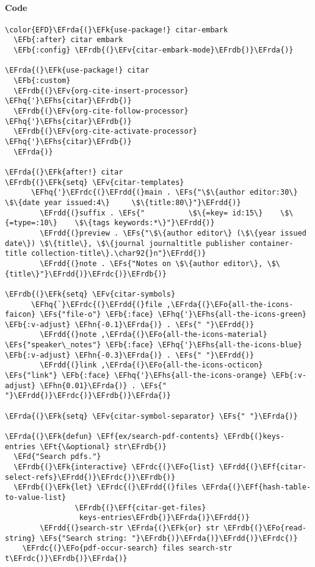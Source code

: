 \documentclass[a4wide,10pt]{article}
\newcommand{\EFs}[1]{\textcolor{EFs}{#1}} %
\newcommand{\EFd}[1]{\textcolor{EFd}{#1}} %
\newcommand{\EFk}[1]{\textcolor{EFk}{#1}} %
\newcommand{\EFb}[1]{\textcolor{EFb}{#1}} %
\newcommand{\EFf}[1]{\textcolor{EFf}{#1}} %
\newcommand{\EFv}[1]{\textcolor{EFv}{#1}} %
\newcommand{\EFt}[1]{\textcolor{EFt}{#1}} %
\newcommand{\EFo}[1]{\textcolor{EFo}{#1}} %
\newcommand{\EFhn}[1]{\textcolor{EFhn}{\textbf{#1}}} %
\newcommand{\EFhq}[1]{\textcolor{EFhq}{#1}} %
\newcommand{\EFhs}[1]{\textcolor{EFhs}{#1}} %
\newcommand{\EFrda}[1]{\textcolor{EFrda}{#1}} %
\newcommand{\EFrdb}[1]{\textcolor{EFrdb}{#1}} %
\newcommand{\EFrdc}[1]{\textcolor{EFrdc}{#1}} %
\newcommand{\EFrdd}[1]{\textcolor{EFrdd}{#1}} %
\begin{document}
\paragraph{Code}
\label{sec:org7fa49ed}
\begin{Code}
\begin{Verbatim}
\color{EFD}\EFrda{(}\EFk{use-package!} citar-embark
  \EFb{:after} citar embark
  \EFb{:config} \EFrdb{(}\EFv{citar-embark-mode}\EFrdb{)}\EFrda{)}

\EFrda{(}\EFk{use-package!} citar
  \EFb{:custom}
  \EFrdb{(}\EFv{org-cite-insert-processor} \EFhq{'}\EFhs{citar}\EFrdb{)}
  \EFrdb{(}\EFv{org-cite-follow-processor} \EFhq{'}\EFhs{citar}\EFrdb{)}
  \EFrdb{(}\EFv{org-cite-activate-processor} \EFhq{'}\EFhs{citar}\EFrdb{)}
  \EFrda{)}

\EFrda{(}\EFk{after!} citar
\EFrdb{(}\EFk{setq} \EFv{citar-templates}
      \EFhq{'}\EFrdc{(}\EFrdd{(}main . \EFs{"\$\{author editor:30\}     \$\{date year issued:4\}     \$\{title:80\}"}\EFrdd{)}
        \EFrdd{(}suffix . \EFs{"          \$\{=key= id:15\}    \$\{=type=:10\}    \$\{tags keywords:*\}"}\EFrdd{)}
        \EFrdd{(}preview . \EFs{"\$\{author editor\} (\$\{year issued date\}) \$\{title\}, \$\{journal journaltitle publisher container-title collection-title\}.\char92{}n"}\EFrdd{)}
        \EFrdd{(}note . \EFs{"Notes on \$\{author editor\}, \$\{title\}"}\EFrdd{)}\EFrdc{)}\EFrdb{)}

\EFrdb{(}\EFk{setq} \EFv{citar-symbols}
      \EFhq{`}\EFrdc{(}\EFrdd{(}file ,\EFrda{(}\EFo{all-the-icons-faicon} \EFs{"file-o"} \EFb{:face} \EFhq{'}\EFhs{all-the-icons-green} \EFb{:v-adjust} \EFhn{-0.1}\EFrda{)} . \EFs{" "}\EFrdd{)}
        \EFrdd{(}note ,\EFrda{(}\EFo{all-the-icons-material} \EFs{"speaker\_notes"} \EFb{:face} \EFhq{'}\EFhs{all-the-icons-blue} \EFb{:v-adjust} \EFhn{-0.3}\EFrda{)} . \EFs{" "}\EFrdd{)}
        \EFrdd{(}link ,\EFrda{(}\EFo{all-the-icons-octicon} \EFs{"link"} \EFb{:face} \EFhq{'}\EFhs{all-the-icons-orange} \EFb{:v-adjust} \EFhn{0.01}\EFrda{)} . \EFs{" "}\EFrdd{)}\EFrdc{)}\EFrdb{)}\EFrda{)}

\EFrda{(}\EFk{setq} \EFv{citar-symbol-separator} \EFs{" "}\EFrda{)}

\EFrda{(}\EFk{defun} \EFf{ex/search-pdf-contents} \EFrdb{(}keys-entries \EFt{\&optional} str\EFrdb{)}
  \EFd{"Search pdfs."}
  \EFrdb{(}\EFk{interactive} \EFrdc{(}\EFo{list} \EFrdd{(}\EFf{citar-select-refs}\EFrdd{)}\EFrdc{)}\EFrdb{)}
  \EFrdb{(}\EFk{let} \EFrdc{(}\EFrdd{(}files \EFrda{(}\EFf{hash-table-to-value-list}
                \EFrdb{(}\EFf{citar-get-files}
                 keys-entries\EFrdb{)}\EFrda{)}\EFrdd{)}
        \EFrdd{(}search-str \EFrda{(}\EFk{or} str \EFrdb{(}\EFo{read-string} \EFs{"Search string: "}\EFrdb{)}\EFrda{)}\EFrdd{)}\EFrdc{)}
    \EFrdc{(}\EFo{pdf-occur-search} files search-str t\EFrdc{)}\EFrdb{)}\EFrda{)}


\end{Verbatim}
\end{Code}
\end{document}
